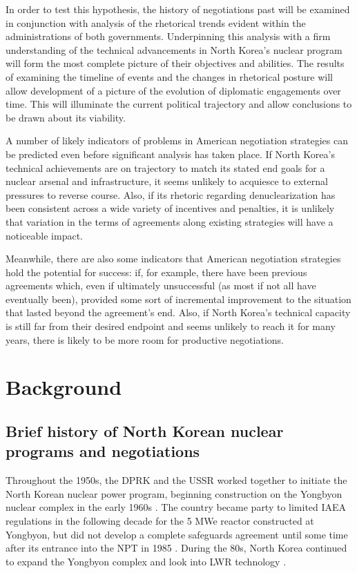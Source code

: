 \documentclass{article}
\begin{document}
In order to test this hypothesis, the history of negotiations past will be examined in conjunction with analysis of the rhetorical trends evident within the administrations of both governments. Underpinning this analysis with a firm understanding of the technical advancements in North Korea's nuclear program will form the most complete picture of their objectives and abilities. The results of examining the timeline of events and the changes in rhetorical posture will allow development of a picture of the evolution of diplomatic engagements over time. This will illuminate the current political trajectory and allow conclusions to be drawn about its viability.

A number of likely indicators of problems in American negotiation strategies can be predicted even before significant analysis has taken place. If North Korea's technical achievements are on trajectory to match its stated end goals for a nuclear arsenal and infrastructure, it seems unlikely to acquiesce to external pressures to reverse course. Also, if its rhetoric regarding denuclearization has been consistent across a wide variety of incentives and penalties, it is unlikely that variation in the terms of agreements along existing strategies will have a noticeable impact.

Meanwhile, there are also some indicators that American negotiation strategies hold the potential for success: if, for example, there have been previous agreements which, even if ultimately unsuccessful (as most if not all have eventually been), provided some sort of incremental improvement to the situation that lasted beyond the agreement's end. Also, if North Korea's technical capacity is still far from their desired endpoint and seems unlikely to reach it for many years, there is likely to be more room for productive negotiations.


\section{Background}

\subsection{Brief history of North Korean nuclear programs and negotiations}

Throughout the 1950s, the DPRK and the USSR worked together to initiate the North Korean nuclear power program, beginning construction on the Yongbyon nuclear complex in the early 1960s \cite{nti15}. The country became party to limited IAEA regulations in the following decade for the 5 MWe reactor constructed at Yongbyon, but did not develop a complete safeguards agreement until some time after its entrance into the NPT in 1985 \cite{iaea09}. During the 80s, North Korea continued to expand the Yongbyon complex and look into LWR technology \cite{ntiYongbyon}.
\end{document}
